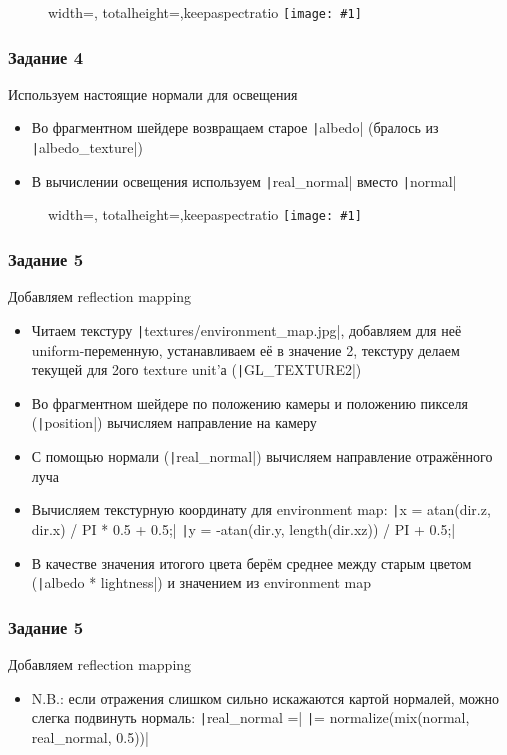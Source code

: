\documentclass[10pt]{beamer}
\newcommand{\slideimage}[1]{
  \begin{figure}
    \begin{adjustbox}{width=\textwidth, totalheight=\textheight-2\baselineskip-2\baselineskip,keepaspectratio}
      \texttt{[image: \#1]}
    \end{adjustbox}
  \end{figure}
}
\begin{document}
\begin{frame}[fragile]
\slideimage{3.png}
\end{frame}

\begin{frame}[fragile]
\frametitle{Задание 4}
Используем настоящие нормали для освещения
\begin{itemize}
\item Во фрагментном шейдере возвращаем старое \texttt|albedo| (бралось из \texttt|albedo_texture|)
\item В вычислении освещения используем \texttt|real_normal| вместо \texttt|normal|
\end{itemize}
\end{frame}

\begin{frame}[fragile]
\slideimage{4.png}
\end{frame}

\begin{frame}[fragile]
\frametitle{Задание 5}
\begin{footnotesize}
Добавляем reflection mapping
\begin{itemize}
\item Читаем текстуру \texttt|textures/environment_map.jpg|, добавляем для неё uniform-переменную, устанавливаем её в значение 2, текстуру делаем текущей для 2ого texture unit'а (\texttt|GL_TEXTURE2|)
\item Во фрагментном шейдере по положению камеры и положению пикселя (\texttt|position|) вычисляем направление на камеру
\item С помощью нормали (\texttt|real_normal|) вычисляем направление отражённого луча
\item Вычисляем текстурную координату для environment map:
\texttt|x = atan(dir.z, dir.x) / PI * 0.5 + 0.5;|
\texttt|y = -atan(dir.y, length(dir.xz)) / PI + 0.5;|
\item В качестве значения итогого цвета берём среднее между старым цветом (\texttt|albedo * lightness|) и значением из environment map
\end{itemize}
\end{footnotesize}
\end{frame}

\begin{frame}[fragile]
\frametitle{Задание 5}
Добавляем reflection mapping
\begin{itemize}
\item N.B.: если отражения слишком сильно искажаются картой нормалей, можно слегка подвинуть нормаль: \texttt|real_normal =| \texttt|= normalize(mix(normal, real_normal, 0.5))|
\end{itemize}
\end{frame}
\end{document}
